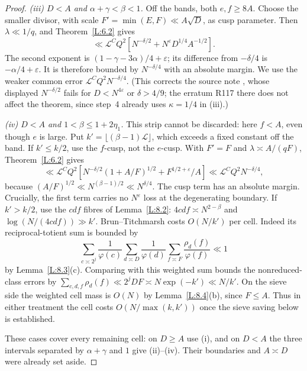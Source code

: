 \documentclass[10pt,reqno]{amsart}
\theoremstyle{definition}
\numberwithin{equation}{section}
\newcommand{\cL}{\mathcal L}
\begin{document}
\begin{proof}
\emph{(iii) $D<A$ and $\alpha+\gamma<\beta<1$.}
Off the bands, both $e,f\geq8A$. Choose the smaller divisor,
with scale $F'=\min(E,F)\ll A\sqrt D$, as cusp parameter.  Then
$\lambda\ll1/q$, and Theorem~\ref{L:6.2} gives
\[
 \ll\cL^C Q^2
 \left[N^{-\delta/2}+N^\varepsilon D^{1/4}A^{-1/2}\right].
\]
The second exponent is $(1-\gamma-3\alpha)/4+\varepsilon$;
its difference from $-\delta/4$ is $-\alpha/4+\varepsilon$.
It is therefore bounded by $N^{-\delta/4}$ with an absolute margin.
We use the weaker common error $\cL^CQ^2N^{-\delta/4}$. (This corrects the
source note \cite[\S8~(b3)]{TTL}, whose displayed $N^{-\delta/2}$ fails for
$D<N^{4\varepsilon}$ or $\delta>4/9$; the erratum R117 there does not
affect the theorem, since step~4 already uses $\kappa=1/4$ in (iii).)

\emph{(iv) $D<A$ and $1<\beta\leq1+2\eta_1$.}
This strip cannot be discarded: here $f<A$, even though $e$ is large.
Put $k'=\lfloor(\beta-1)\cL\rfloor$, which exceeds a fixed constant
off the band.  If $k'\leq k/2$, use the $f$-cusp, not the $e$-cusp.
With $F'=F$ and $\lambda\asymp A/(qF)$, Theorem~\ref{L:6.2} gives
\[
 \ll\cL^CQ^2
 \left[N^{-\delta/2}(1+A/F)^{1/2}+F^{1/2+\varepsilon}/A\right]
 \ll\cL^CQ^2N^{-\delta/4},
\]
because $(A/F)^{1/2}\ll N^{(\beta-1)/2}\ll N^{\delta/4}$.
The cusp term has an absolute margin.  Crucially, the first term
carries no $N^\varepsilon$ loss at the degenerating boundary.
If $k'>k/2$, use the $cdf$ fibres of Lemma~\ref{L:8.2}:
$4cdf\asymp N^{2-\beta}$ and $\log(N/(4cdf))\gg k'$.
Brun--Titchmarsh costs $O(N/k')$ per cell.  Indeed its reciprocal-totient
sum is bounded by
\[
 \sum_{c\asymp2^j}\frac1{\varphi(c)}
 \sum_{d\asymp D}\frac1{\varphi(d)}
 \sum_{f\asymp F}\frac{\rho_d(f)}{\varphi(f)}\ll1
\]
by Lemma~\ref{L:8.3}(c). Comparing with this weighted sum bounds the
nonreduced-class errors by $\sum_{c,d,f}\rho_d(f)\ll 2^jDF
\asymp N\exp(-k')\ll N/k'$. On the sieve side the weighted cell mass is $O(N)$
by Lemma~\ref{L:8.4}(b), since $F\leq A$.  Thus in either treatment
the cell costs $O(N/\max(k,k'))$ once the sieve saving below is established.

These cases cover every remaining cell: on $D\geq A$ use (i), and on
$D<A$ the three intervals separated by $\alpha+\gamma$ and $1$ give
(ii)--(iv).  Their boundaries and $A\asymp D$ were already set aside.


\end{proof}
\end{document}
